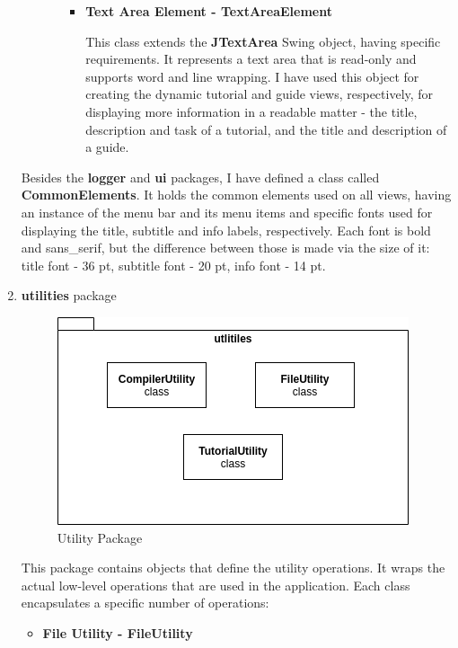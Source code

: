 \documentclass[12pt,a4paper,twoside]{report}
\begin{document}
\begin{enumerate}
\begin{itemize}
\begin{itemize}
\begin{itemize}
\item \textbf{Text Area Element - TextAreaElement}

	This class extends the \textbf{JTextArea} Swing object, having specific requirements. It represents a text area that is read-only and supports word and line wrapping. I have used this object for creating the dynamic tutorial and guide views, respectively, for displaying more information in a readable matter - the title, description and task of a tutorial, and the title and description of a guide.
	
\end{itemize}
\end{itemize}
\end{itemize}

Besides the \textbf{logger} and \textbf{ui} packages, I have defined a class called \textbf{CommonElements}. It holds the common elements used on all views, having an instance of the menu bar and its menu items and specific fonts used for displaying the title, subtitle and info labels, respectively. Each font is bold and sans\_serif, but the difference between those is made via the size of it: title font - 36 pt, subtitle font - 20 pt, info font - 14 pt. 


\item \textbf{utilities} package

\begin{figure}[H]
    \centering
    \includegraphics[width=0.8\linewidth]{img/diags/UtilityPackage.png}
    \caption{Utility Package}
    \label{fig:conf}
\end{figure}

This package contains objects that define the utility operations. It wraps the actual low-level operations that are used in the application. Each class encapsulates a specific number of operations:
\begin{itemize}
\item \textbf{File Utility - FileUtility}
	

\end{itemize}
\end{enumerate}
\end{document}
